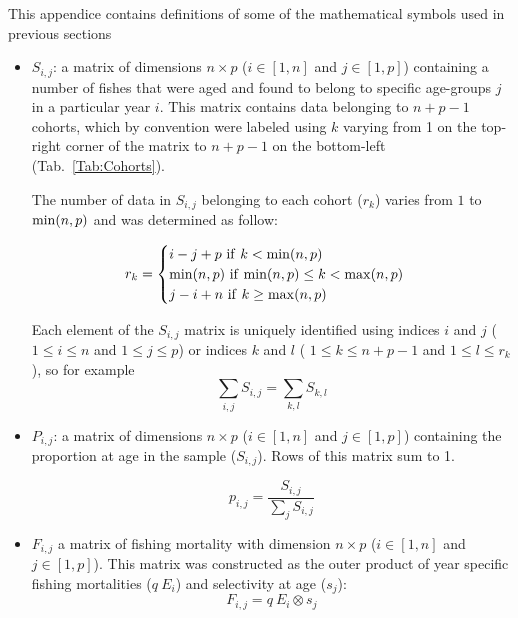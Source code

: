 \label{Appendix:DefinitionsOfMathematicalSymbols}

This appendice contains definitions of some of the mathematical symbols used in previous sections

\begin{itemize}

\item $S_{i,j}$: a matrix of dimensions $n \times p$ ($i \in [1, n]$ and $j \in [1, p]$) containing a number of fishes that were aged and found to belong to specific age-groups $j$ in a particular year $i$. This matrix contains data belonging to $n+p-1$ cohorts, which by convention were labeled using $k$ varying from 1 on the top-right corner of the matrix to $n+p-1$ on the bottom-left (Tab.~\ref{Tab:Cohorts}). 



The number of data in $S_{i,j}$ belonging to each cohort ($r_{k}$) varies from $1$ to ${\rm min}(n,p)$ and was determined as follow:

\begin{equation}
r_{k} = 
\begin{cases}
i - j + p \ {\rm if} \ k < {\rm min}(n,p)  \\ 
{\rm min}(n,p) \ {\rm if} \ {\rm min}(n,p) \leq k < {\rm max}(n,p) \\
j - i + n \ {\rm if} \ k \geq {\rm max}(n,p) \\
\end{cases}
\end{equation}


\noindent Each element of the $S_{i,j}$ matrix is uniquely identified using indices $i$ and $j$ ( $1 \leq i \leq n$ and $ 1 \leq j \leq p$) or indices $k$ and $l$ ( $ 1 \leq k \leq n+p-1 $ and $ 1 \leq l \leq r_{k}$ ), so for example
\begin{equation}
  \sum_{i,j} S_{i,j} = \sum_{k,l} S_{k,l}
\end{equation}

\item $P_{i,j}$: a matrix of dimensions $n \times p$ ($i \in [1, n]$ and $j \in [1, p]$) containing the proportion at age in the sample ($S_{i,j}$). Rows of this matrix sum to 1.

\begin{equation}
p_{i,j} = \frac{S_{i,j}}{\sum_{j} S_{i,j}}
\end{equation}

\item $F_{i,j}$ a matrix of fishing mortality with dimension $n \times p$ ($i \in [1, n]$ and $j \in [1, p]$). This matrix was constructed as the outer product of year specific fishing mortalities ($q \ E_{i}$) and selectivity at age ($s_{j}$):
\begin{equation}
F_{i,j} = q \ E_{i} \otimes s_{j}
\end{equation}

\end{itemize}
